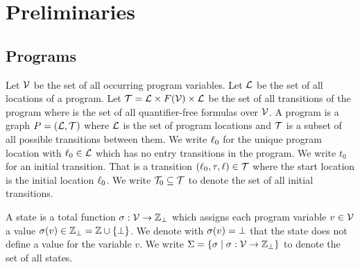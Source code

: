 \section{Preliminaries}


\subsection{Programs}

\begin{definition}[Program] 
  Let $\mathcal{V}$ be the set of all occurring program variables.
  Let $\mathcal{L}$ be the set of all locations of a program.
  Let $\mathcal{T} = \mathcal{L} \times F(\mathcal{V}) \times \mathcal{L}$ be the set of all transitions of the program where  is the set of all quantifier-free formulas over $\mathcal{V}$.
  A program is a graph $P = (\mathcal{L}, \mathcal{T})$ where $\mathcal{L}$ is the set of program locations and $\mathcal{T}$ is a subset of all possible transitions between them.
  We write $\ell_0$ for the unique program location with $\ell_0 \in \mathcal{L}$ which has no entry transitions in the program.
  We write $t_0$ for an initial transition. That is a transition $(\ell_0, \tau, \ell) \in \mathcal{T}$ where the start location is the initial location $\ell_0$.
  We write $\mathcal{T}_0 \subseteq \mathcal{T}$ to denote the set of all initial transitions.
\end{definition}

\begin{definition}[State] 
  A state is a total function $\sigma: \mathcal{V} \rightarrow \mathbb{Z}_\bot$ which assigns each program variable $v \in \mathcal{V}$ a value $\sigma(v) \in \mathbb{Z}_\bot = \mathbb{Z} \cup \lbrace \bot \rbrace$.
  We denote with $\sigma(v) = \bot$ that the state does not define a value for the variable $v$.
  We write $\Sigma = \lbrace  \sigma \mid \sigma: \mathcal{V} \rightarrow \mathbb{Z}_\bot \rbrace$ to denote the set of all states.
\end{definition}

